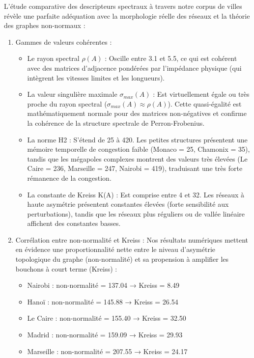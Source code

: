\documentclass[10pt, a4paper]{article}
\providecommand{\tightlist}{}
\begin{document}
L'étude comparative des descripteurs spectraux à travers notre corpus de
villes révèle une parfaite adéquation avec la morphologie réelle des
réseaux et la théorie des graphes non-normaux :

\begin{enumerate}
\def\labelenumi{\arabic{enumi}.}
\item
  Gammes de valeurs cohérentes :

  \begin{itemize}
  \tightlist
  \item
    Le rayon spectral \(\rho(A)\) : Oscille entre 3.1 et 5.5, ce qui est
    cohérent avec des matrices d'adjacence pondérées par l'impédance
    physique (qui intègrent les vitesses limites et les longueurs).
  \item
    La valeur singulière maximale \(\sigma_{max}(A)\) : Est
    virtuellement égale ou très proche du rayon spectral
    (\(\sigma_{max}(A) \approx \rho(A)\)). Cette quasi-égalité est
    mathématiquement normale pour des matrices non-négatives et confirme
    la cohérence de la structure spectrale de Perron-Frobenius.
  \item
    La norme H2 : S'étend de 25 à 420. Les petites structures présentent
    une mémoire temporelle de congestion faible (Monaco = 25, Chamonix =
    35), tandis que les mégapoles complexes montrent des valeurs très
    élevées (Le Caire = 236, Marseille = 247, Nairobi = 419), traduisant
    une très forte rémanence de la congestion.
  \item
    La constante de Kreiss K(A) : Est comprise entre 4 et 32. Les
    réseaux à haute asymétrie présentent constantes élevées (forte
    sensibilité aux perturbations), tandis que les réseaux plus
    réguliers ou de vallée linéaire affichent des constantes basses.
  \end{itemize}
\item
  Corrélation entre non-normalité et Kreiss : Nos résultats numériques
  mettent en évidence une proportionnalité nette entre le niveau
  d'asymétrie topologique du graphe (non-normalité) et sa propension à
  amplifier les bouchons à court terme (Kreiss) :

  \begin{itemize}
  \tightlist
  \item
    Nairobi : non-normalité = 137.04 → Kreiss = 8.49
  \item
    Hanoï : non-normalité = 145.88 → Kreiss = 26.54
  \item
    Le Caire : non-normalité = 155.40 → Kreiss = 32.50
  \item
    Madrid : non-normalité = 159.09 → Kreiss = 29.93
  \item
    Marseille : non-normalité = 207.55 → Kreiss = 24.17
  \end{itemize}


\end{enumerate}
\end{document}

